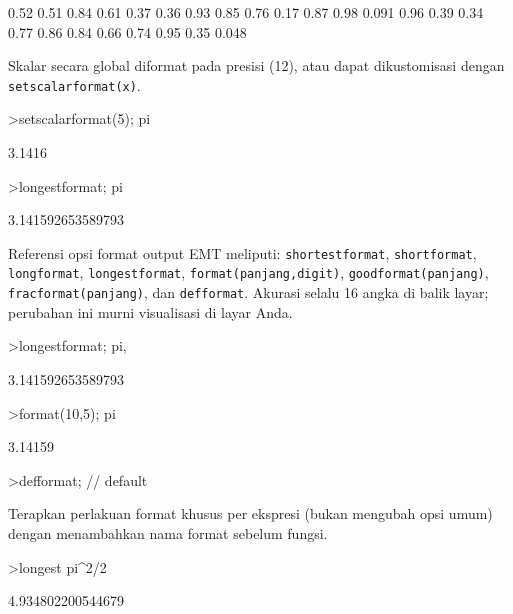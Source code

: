 \documentclass[a4paper,11pt,oneside,enabledeprecatedfontcommands]{scrbook}
\newenvironment{eulernotebook}{}{}
\newenvironment{eulercomment}{\par\medskip\noindent}{\par\medskip}
\begin{document}
\begin{eulernotebook}
\begin{euleroutput}
  0.52   0.51   0.84   0.61   0.37   0.36   0.93   0.85 
  0.76   0.17   0.87   0.98  0.091   0.96   0.39   0.34 
  0.77   0.86   0.84   0.66   0.74   0.95   0.35  0.048 
\end{euleroutput}
\begin{eulercomment}
Skalar secara global diformat pada presisi (12), atau dapat dikustomisasi dengan \texttt{setscalarformat(x)}.
\end{eulercomment}
\begin{eulerprompt}
>setscalarformat(5); pi
\end{eulerprompt}
\begin{euleroutput}
3.1416
\end{euleroutput}
\begin{eulerprompt}
>longestformat; pi
\end{eulerprompt}
\begin{euleroutput}
3.141592653589793
\end{euleroutput}
\begin{eulercomment}
Referensi opsi format output EMT meliputi: \texttt{shortestformat}, \texttt{shortformat}, \texttt{longformat}, \texttt{longestformat}, \texttt{format(panjang,digit)}, \texttt{goodformat(panjang)}, \texttt{fracformat(panjang)}, dan \texttt{defformat}. Akurasi selalu 16 angka di balik layar; perubahan ini murni visualisasi di layar Anda.
\end{eulercomment}
\begin{eulerprompt}
>longestformat; pi,
\end{eulerprompt}
\begin{euleroutput}
3.141592653589793
\end{euleroutput}
\begin{eulerprompt}
>format(10,5); pi
\end{eulerprompt}
\begin{euleroutput}
  3.14159 
\end{euleroutput}
\begin{eulerprompt}
>defformat; // default
\end{eulerprompt}
\begin{eulercomment}
Terapkan perlakuan format khusus per ekspresi (bukan mengubah opsi umum) dengan menambahkan nama format sebelum fungsi.
\end{eulercomment}
\begin{eulerprompt}
>longest pi^2/2
\end{eulerprompt}
\begin{euleroutput}
      4.934802200544679 
\end{euleroutput}

\end{eulernotebook}
\end{document}
